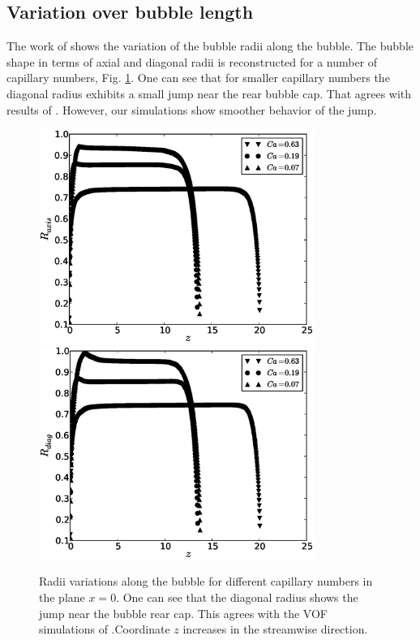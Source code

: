 \documentclass[preprint,12pt]{elsarticle}
\begin{document}
\subsection{Variation over bubble length}
The work of \citet{wang-non-circular} shows the variation of the bubble
radii along the
bubble. The bubble shape in terms of axial and diagonal radii is reconstructed for a number of
capillary numbers, Fig. \ref{fig:bubble:variation:capillaries}. One can see that for smaller
capillary numbers the diagonal radius exhibits a small jump near the rear bubble cap. That agrees
with results of \citet{wang-non-circular}. However, our simulations show smoother behavior of
the jump.  
\begin{figure}[ht]
\includegraphics[width=0.8\textwidth]{Figures/bubble_rad_axis.eps}\\
\includegraphics[width=0.8\textwidth]{Figures/bubble_rad_diag.eps}\\
\caption{Radii variations along the bubble for different capillary numbers in the plane $x=0$.
One can see that the diagonal radius shows the jump near the bubble rear cap. This agrees with the
VOF simulations of \citet{wang-non-circular}.Coordinate $z$ increases in the streamwise direction.
\label{fig:bubble:variation:capillaries}}
\end{figure}
\end{document}
